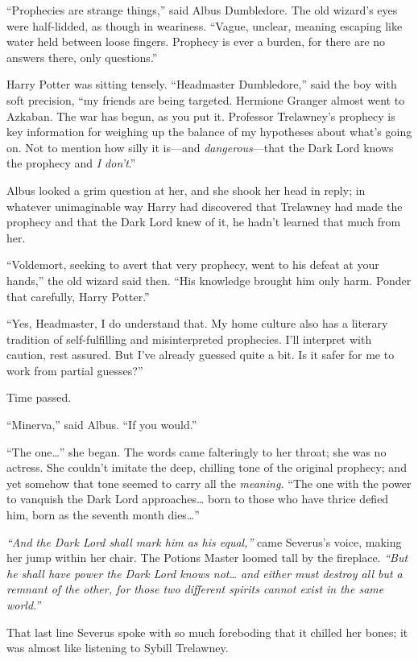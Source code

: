 ``Prophecies are strange things,'' said Albus Dumbledore. The old
wizard's eyes were half-lidded, as though in weariness. ``Vague,
unclear, meaning escaping like water held between loose fingers.
Prophecy is ever a burden, for there are no answers there, only
questions.''

Harry Potter was sitting tensely. ``Headmaster Dumbledore,'' said the
boy with soft precision, ``my friends are being targeted. Hermione
Granger almost went to Azkaban. The war has begun, as you put it.
Professor Trelawney's prophecy is key information for weighing up the
balance of my hypotheses about what's going on. Not to mention how silly
it is---and \emph{dangerous}---that the Dark Lord knows the prophecy and
\emph{I don't}.''

Albus looked a grim question at her, and she shook her head in reply; in
whatever unimaginable way Harry had discovered that Trelawney had made
the prophecy and that the Dark Lord knew of it, he hadn't learned that
much from her.

``Voldemort, seeking to avert that very prophecy, went to his defeat at
your hands,'' the old wizard said then. ``His knowledge brought him only
harm. Ponder that carefully, Harry Potter.''

``Yes, Headmaster, I do understand that. My home culture also has a
literary tradition of self-fulfilling and misinterpreted prophecies.
I'll interpret with caution, rest assured. But I've already guessed
quite a bit. Is it safer for me to work from partial guesses?''

Time passed.

``Minerva,'' said Albus. ``If you would.''

``The one\ldots{}'' she began. The words came falteringly to her throat;
she was no actress. She couldn't imitate the deep, chilling tone of the
original prophecy; and yet somehow that tone seemed to carry all the
\emph{meaning.} ``The one with the power to vanquish the Dark Lord
approaches\ldots{} born to those who have thrice defied him, born as the
seventh month dies\ldots{}''

\emph{``And the Dark Lord shall mark him as his equal,''} came Severus's
voice, making her jump within her chair. The Potions Master loomed tall
by the fireplace. \emph{``But he shall have power the Dark Lord knows
not\ldots{} and either must destroy all but a remnant of the other, for
those two different spirits cannot exist in the same world.''}

That last line Severus spoke with so much foreboding that it chilled her
bones; it was almost like listening to Sybill Trelawney.

